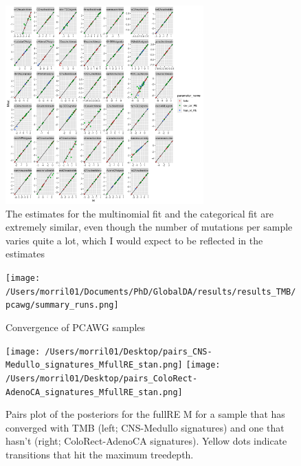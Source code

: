 \documentclass{article}
\begin{document}
\begin{enumerate}
\begin{figure}[h]
\centering
\includegraphics[width=3in]{figures/M_vs_catM_scatter.png}
\caption{The estimates for the multinomial fit and the categorical fit are extremely similar, even though the number of mutations per sample varies quite a lot, which I would expect to be reflected in the estimates}
\end{figure}

\end{enumerate}

\begin{figure}[h]
\centering
\texttt{[image: /Users/morril01/Documents/PhD/GlobalDA/results/results\_TMB/pcawg/summary\_runs.png]}
\caption{Convergence of PCAWG samples \label{convergence}}
\end{figure}

\begin{figure}[h]
\centering\texttt{[image: /Users/morril01/Desktop/pairs\_CNS-Medullo\_signatures\_MfullRE\_stan.png]}
\texttt{[image: /Users/morril01/Desktop/pairs\_ColoRect-AdenoCA\_signatures\_MfullRE\_stan.png]}
\caption{Pairs plot of the posteriors for the fullRE M for a sample that has converged with TMB (left; CNS-Medullo signatures) and one that hasn't (right; ColoRect-AdenoCA signatures). Yellow dots indicate transitions that hit the maximum treedepth.}
\end{figure}
\end{document}
